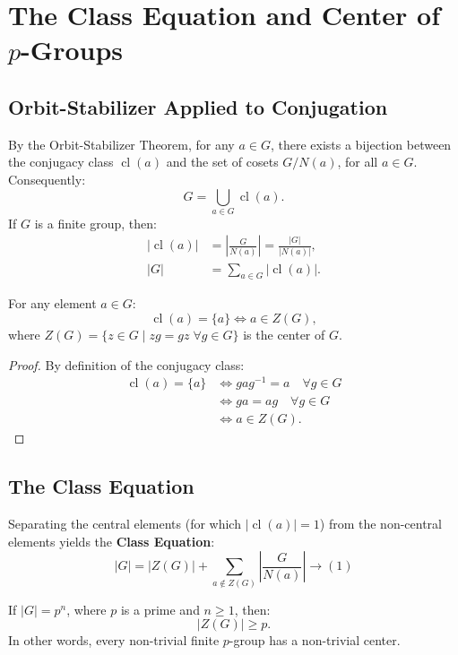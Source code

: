 \section{The Class Equation and Center of \texorpdfstring{$p$-Groups}{p-Groups}}

\subsection{Orbit-Stabilizer Applied to Conjugation}

By the Orbit-Stabilizer Theorem, for any $a \in G$, there exists a bijection between the conjugacy class $\operatorname{cl}(a)$ and the set of cosets $G/N(a)$, for all $a \in G$. Consequently:
\[
G = \bigcup_{a \in G} \operatorname{cl}(a).
\]
If $G$ is a finite group, then:
\begin{align*}
|\operatorname{cl}(a)| &= \left|\frac{G}{N(a)}\right| = \frac{|G|}{|N(a)|}, \\
|G| &= \sum_{a \in G} |\operatorname{cl}(a)|.
\end{align*}

\begin{proposition}
For any element $a \in G$:
\[
\operatorname{cl}(a) = \{a\} \iff a \in Z(G),
\]
where $Z(G) = \{z \in G \mid zg = gz \; \forall g \in G\}$ is the center of $G$.
\end{proposition}

\begin{proof}
By definition of the conjugacy class:
\begin{align*}
\operatorname{cl}(a) = \{a\} &\iff gag^{-1} = a \quad \forall g \in G \\
&\iff ga = ag \quad \forall g \in G \\
&\iff a \in Z(G).
\end{align*}
\end{proof}

\subsection{The Class Equation}

Separating the central elements (for which $|\operatorname{cl}(a)| = 1$) from the non-central elements yields the \textbf{Class Equation}:
\[
|G| = |Z(G)| + \sum_{a \notin Z(G)} \left|\frac{G}{N(a)}\right| \longrightarrow (1)
\]

\begin{theorem}
If $|G| = p^n$, where $p$ is a prime and $n \ge 1$, then:
\[
|Z(G)| \ge p.
\]
In other words, every non-trivial finite $p$-group has a non-trivial center.
\end{theorem}

